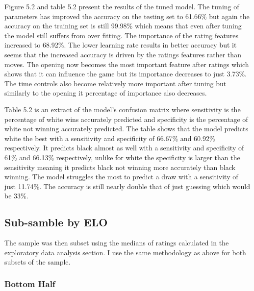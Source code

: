 \documentclass[12pt,preprint, authoryear]{elsarticle}
\numberwithin{equation}{section}
\numberwithin{figure}{section}
\numberwithin{table}{section}
\begin{document}
Figure 5.2 and table 5.2 present the results of the tuned model. The
tuning of parameters has improved the accuracy on the testing set to
61.66\% but again the accuracy on the training set is still 99.98\%
which means that even after tuning the model still suffers from over
fitting. The importance of the rating features increased to 68.92\%. The
lower learning rate results in better accuracy but it seems that the
increased accuracy is driven by the ratings features rather than moves.
The opening now becomes the most important feature after ratings which
shows that it can influence the game but its importance decreases to
just 3.73\%. The time controls also become relatively more important
after tuning but similarly to the opening it percentage of importance
also decreases.

Table 5.2 is an extract of the model's confusion matrix where
sensitivity is the percentage of white wins accurately predicted and
specificity is the percentage of white not winning accurately predicted.
The table shows that the model predicts white the best with a
sensitivity and specificity of 66.67\% and 60.92\% respectively. It
predicts black almost as well with a sensitivity and specificity of 61\%
and 66.13\% respectively, unlike for white the specificity is larger
than the sensitivity meaning it predicts black not winning more
accurately than black winning. The model struggles the most to predict a
draw with a sensitivity of just 11.74\%. The accuracy is still nearly
double that of just guessing which would be 33\%.

\hypertarget{sub-samble-by-elo}{%
\subsection{Sub-samble by ELO}\label{sub-samble-by-elo}}

The sample was then subset using the medians of ratings calculated in
the exploratory data analysis section. I use the same methodology as
above for both subsets of the sample.

\hypertarget{bottom-half}{%
\subsubsection{Bottom Half}\label{bottom-half}}
\end{document}
